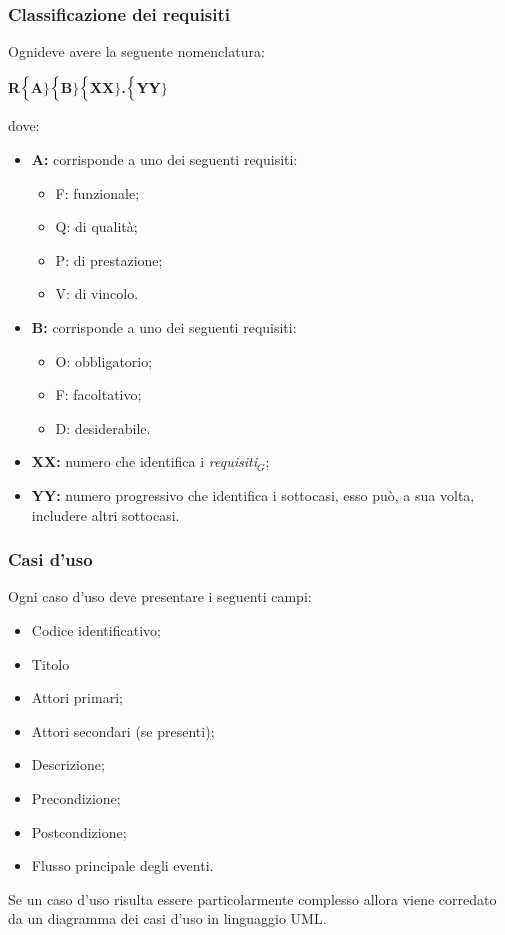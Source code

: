 \subsubsection{Classificazione dei requisiti}
Ognideve avere la seguente nomenclatura:
\begin{center}
	\textbf{R$\Bigl\{$A$\Bigr\}$$\Bigl\{$B$\Bigr\}$$\Bigl\{$XX$\Bigr\}$.$\Bigl\{$YY$\Bigr\}$}
\end{center}
dove:
\begin{itemize}
	\item \textbf{A:} corrisponde a uno dei seguenti requisiti:
	\begin{itemize}
		\item F: funzionale;
		\item Q: di qualità;
		\item P: di prestazione;
		\item V: di vincolo.
	\end{itemize}
	\item \textbf{B:} corrisponde a uno dei seguenti requisiti:
	\begin{itemize}
		\item O: obbligatorio;
		\item F: facoltativo;
		\item D: desiderabile.
	\end{itemize}
	\item \textbf{{XX}:} numero che identifica i \textit{requisiti$_{G}$};
	\item \textbf{{YY}:} numero progressivo che identifica i sottocasi, esso può, a sua volta, includere altri sottocasi.
\end{itemize}

\subsubsection{Casi d'uso}
Ogni caso d'uso deve presentare i seguenti campi:
\begin{itemize}
	\item Codice identificativo;
	\item Titolo
	\item Attori primari;
	\item Attori secondari (se presenti);
	\item Descrizione;
	\item Precondizione;
	\item Postcondizione;
	\item Flusso principale degli eventi.
\end{itemize}
Se un caso d'uso risulta essere particolarmente complesso allora viene corredato da un diagramma dei casi d'uso in linguaggio UML.
